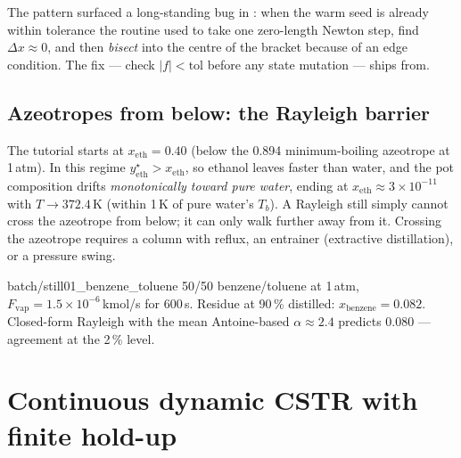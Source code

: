 \documentclass[11pt,a4paper]{article}
\begin{document}
The pattern surfaced a long-standing bug in :
when the warm seed is already within tolerance the routine used to
take one zero-length Newton step, find $\Delta x \approx 0$, and
then \emph{bisect} into the centre of the bracket because of an
 edge condition.  The fix --- check
$|f| < \mathrm{tol}$ before any state mutation --- ships from.

\subsection*{Azeotropes from below: the Rayleigh barrier}

The  tutorial starts at
$x_{\mathrm{eth}} = 0.40$ (below the 0.894 minimum-boiling
azeotrope at 1\,atm).  In this regime
$y_{\mathrm{eth}}^{\star} > x_{\mathrm{eth}}$, so ethanol leaves
faster than water, and the pot composition drifts
\emph{monotonically toward pure water}, ending at
$x_{\mathrm{eth}} \approx 3 \times 10^{-11}$ with $T \to 372.4$\,K
(within 1\,K of pure water's $T_b$).  A Rayleigh still simply
cannot cross the azeotrope from below; it can only walk further
away from it.  Crossing the azeotrope requires a column with
reflux, an entrainer (extractive distillation), or a pressure
swing.

\begin{tutoriallink}{batch/still01\_benzene\_toluene}
50/50 benzene/toluene at 1\,atm, $F_{\mathrm{vap}} = 1.5 \times
10^{-6}$\,kmol/s for 600\,s.  Residue at 90\,\% distilled:
$x_{\mathrm{benzene}} = 0.082$.  Closed-form Rayleigh with the
mean Antoine-based $\alpha \approx 2.4$ predicts $0.080$ ---
agreement at the 2\,\% level.
\end{tutoriallink}

\section{Continuous dynamic CSTR with finite hold-up}\label{ch:dyn-cstr}
\end{document}
